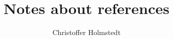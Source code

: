 \documentclass[11pt, a4paper, oneside]{book}
\begin{document}
\frontmatter
%
\title{Notes about references}
%
\author{Christoffer Holmstedt}
%


\tableofcontents

\listoffigures
{}
\listoftables
{}
%

\mainmatter
\pagestyle{footerPageNumberMiddle}



\end{document}
